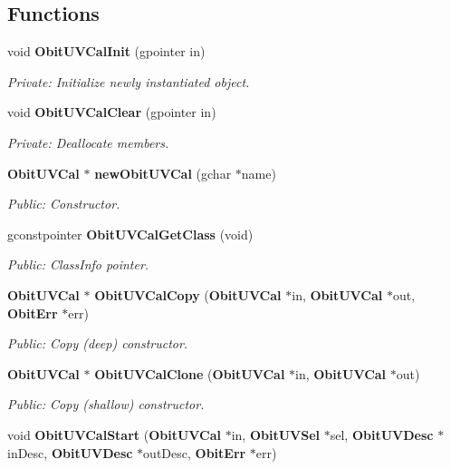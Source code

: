 \subsection*{Functions}
\begin{CompactItemize}
\item 
void {\bf Obit\-UVCal\-Init} (gpointer in)
\begin{CompactList}\small\item\em Private: Initialize newly instantiated object. \item\end{CompactList}\item 
void {\bf Obit\-UVCal\-Clear} (gpointer in)
\begin{CompactList}\small\item\em Private: Deallocate members. \item\end{CompactList}\item 
{\bf Obit\-UVCal} $\ast$ {\bf new\-Obit\-UVCal} (gchar $\ast$name)
\begin{CompactList}\small\item\em Public: Constructor. \item\end{CompactList}\item 
gconstpointer {\bf Obit\-UVCal\-Get\-Class} (void)
\begin{CompactList}\small\item\em Public: Class\-Info pointer. \item\end{CompactList}\item 
{\bf Obit\-UVCal} $\ast$ {\bf Obit\-UVCal\-Copy} ({\bf Obit\-UVCal} $\ast$in, {\bf Obit\-UVCal} $\ast$out, {\bf Obit\-Err} $\ast$err)
\begin{CompactList}\small\item\em Public: Copy (deep) constructor. \item\end{CompactList}\item 
{\bf Obit\-UVCal} $\ast$ {\bf Obit\-UVCal\-Clone} ({\bf Obit\-UVCal} $\ast$in, {\bf Obit\-UVCal} $\ast$out)
\begin{CompactList}\small\item\em Public: Copy (shallow) constructor. \item\end{CompactList}\item 
void {\bf Obit\-UVCal\-Start} ({\bf Obit\-UVCal} $\ast$in, {\bf Obit\-UVSel} $\ast$sel, {\bf Obit\-UVDesc} $\ast$in\-Desc, {\bf Obit\-UVDesc} $\ast$out\-Desc, {\bf Obit\-Err} $\ast$err)

\end{CompactItemize}
